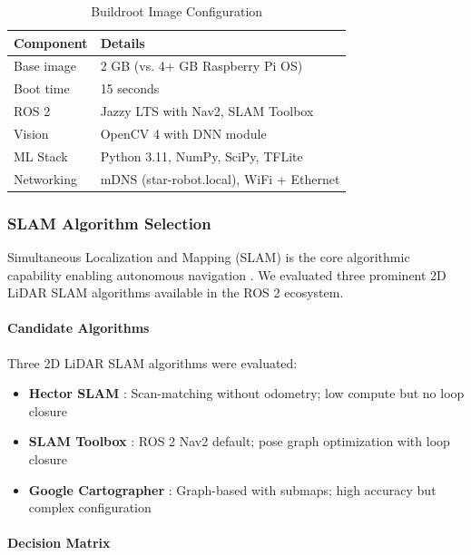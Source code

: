 \begin{table}[H]
\centering
\caption{Buildroot Image Configuration}
\begin{tabular}{@{}ll@{}}
\toprule
\textbf{Component} & \textbf{Details} \\
\midrule
Base image & 2 GB (vs. 4+ GB Raspberry Pi OS) \\
Boot time & 15 seconds \\
ROS 2 & Jazzy LTS with Nav2, SLAM Toolbox \\
Vision & OpenCV 4 with DNN module \\
ML Stack & Python 3.11, NumPy, SciPy, TFLite \\
Networking & mDNS (star-robot.local), WiFi + Ethernet \\
\bottomrule
\end{tabular}
\end{table}

\subsubsection{SLAM Algorithm Selection}

Simultaneous Localization and Mapping (SLAM) is the core algorithmic capability enabling autonomous navigation \parencite{thrun_probabilistic_robotics}. We evaluated three prominent 2D LiDAR SLAM algorithms available in the ROS 2 ecosystem.

\paragraph{Candidate Algorithms}

Three 2D LiDAR SLAM algorithms were evaluated:
\begin{itemize}
    \item \textbf{Hector SLAM} \parencite{hector_slam}: Scan-matching without odometry; low compute but no loop closure
    \item \textbf{SLAM Toolbox} \parencite{slam_toolbox}: ROS 2 Nav2 default; pose graph optimization with loop closure
    \item \textbf{Google Cartographer} \parencite{cartographer}: Graph-based with submaps; high accuracy but complex configuration
\end{itemize}

\paragraph{Decision Matrix}

